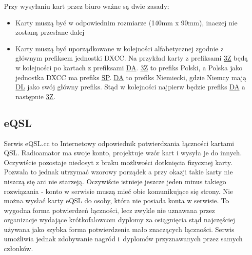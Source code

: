 \documentclass[]{mgr}
\begin{document}
                Przy wysyłaniu kart przez biuro ważne są dwie zasady:
                \begin{itemize}
                    \item Karty muszą być w odpowiednim rozmiarze (140mm x 90mm), inaczej nie zostaną przesłane dalej
                    \item Karty muszą być uporządkowane w kolejności alfabetycznej zgodnie z głównym prefiksem jednostki DXCC. Na przykład karty z prefiksami \underline{3Z} będą w kolejności po kartach z prefiksami \underline{DA}. \underline{3Z} to prefiks Polski, a Polska jako jednostka DXCC ma prefiks \underline{SP}. \underline{DA} to prefiks Niemiecki, gdzie Niemcy mają \underline{DL} jako swój główny prefiks. Stąd w kolejności najpierw będzie prefiks \underline{DA} a następnie \underline{3Z}.
                \end{itemize}

            \subsection{eQSL}
            Serwis eQSL.cc to Internetowy odpowiednik potwierdzania łączności kartami QSL. Radioamator ma swoje konto, projektuje wzór kart i wysyła je do innych. Oczywiście pozostaje niedosyt z braku możliwości dotknięcia fizycznej karty. Pozwala to jednak utrzymać wzorowy porządek a przy okazji takie karty nie niszczą się ani nie starzeją. Oczywiście istnieje jeszcze jeden minus takiego rozwiązania - konto w serwisie muszą mieć obie komunikujące się strony. Nie można wysłać karty eQSL do osoby, która nie posiada konta w serwisie. To wygodna forma potwierdzeń łączności, lecz zwykle nie uznawana przez organizacje wydające krótkofalowcom dyplomy za osiągnięcia stąd najczęściej używana jako szybka forma potwierdzenia mało znaczących łączności. Serwis umożliwia jednak zdobywanie nagród i~dyplomów przyznawanych przez samych członków. 
\end{document}
